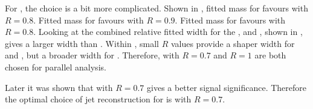 For , the choice is a bit more complicated. Shown in , fitted mass for \Hbb favours \normalPFO with $R = 0.8$. Fitted mass for \HWW favours \tightPFO with $R = 0.9$. Fitted mass for \PW favours \tightPFO with $R = 0.8$. Looking at the combined relative fitted width for the \Hbb, \HWW and \PW, shown in , \normalPFO gives a larger width than \tightPFO. Within \tightPFO, small $R$ values provide a shaper width for \HWW and \Hbb, but a broader width for \PW. Therefore, \tightPFO with $R = 0.7$ and $R = 1$ are both chosen for parallel analysis.

Later it was shown that \tightPFO with $R = 0.7$ gives a better signal significance. Therefore the optimal choice of jet reconstruction for  is \tightPFO with $R = 0.7$.

